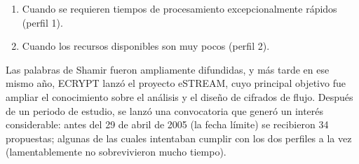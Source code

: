 \begin{enumerate}
  \item Cuando se requieren tiempos de procesamiento excepcionalmente rápidos
    (perfil 1).
  \item Cuando los recursos disponibles son muy pocos (perfil 2).
\end{enumerate}

Las palabras de Shamir fueron ampliamente difundidas, y más tarde en ese mismo
año, ECRYPT lanzó el proyecto eSTREAM, cuyo principal objetivo fue ampliar el
conocimiento sobre el análisis y el diseño de cifrados de flujo. Después de un
periodo de estudio, se lanzó una convocatoria que generó un interés
considerable: antes del 29 de abril de 2005 (la fecha límite) se recibieron
34 propuestas; algunas de las cuales intentaban cumplir con los dos perfiles a
la vez (lamentablemente no sobrevivieron mucho tiempo).
